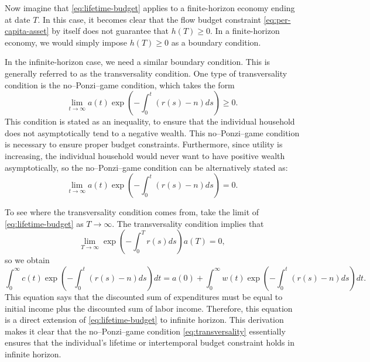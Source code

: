 \documentclass[\topdir/lecture\_notes.tex]{subfiles}
\begin{document}
Now imagine that \eqref{eq:lifetime-budget} applies to a finite-horizon economy ending at date \(T\).
In this case, it becomes clear that the flow budget constraint \eqref{eq:per-capita-asset} by itself does not guarantee that \(h(T) \geq 0\).
In a finite-horizon economy, we would simply impose \(h(T) \geq 0\) as a boundary condition.

In the infinite-horizon case, we need a similar boundary condition.
This is generally referred to as the transversality condition.
One type of transversality condition is the no--Ponzi--game condition, which takes the form
\begin{equation}
  \lim _{t \rightarrow \infty} a(t) \exp \left(-\int_{0}^{t}(r(s)-n) ds\right) \geq 0.
  \label{eq:no-ponzi}
\end{equation}
This condition is stated as an inequality, to ensure that the individual household does not asymptotically tend to a negative wealth.
This no--Ponzi--game condition is necessary to ensure proper budget constraints.
Furthermore, since utility is increasing, the individual household would never want to have positive wealth asymptotically, so the no--Ponzi--game condition can be alternatively stated as:
\begin{equation}
  \lim _{t \rightarrow \infty} a(t) \exp \left(-\int_{0}^{t}(r(s)-n) ds\right)=0.
  \label{eq:transversality}
\end{equation}

To see where the transversality condition comes from, take the limit of \eqref{eq:lifetime-budget} as \(T \rightarrow \infty\). The transversality condition implies that
\[
  \lim_{T\to\infty}\exp \left(-\int_{0}^{T} r(s) ds\right) a(T) =0,
\]
so we obtain
\[
  \int_{0}^{\infty} c(t) \exp \left(-\int_{0}^{t}(r(s)-n) ds\right) dt=a(0)+\int_{0}^{\infty} w(t) \exp \left(-\int_{0}^{t}(r(s)-n) ds\right) dt.
\]
This equation says that the discounted sum of expenditures must be equal to initial income plus the discounted sum of labor income.
Therefore, this equation is a direct extension of \eqref{eq:lifetime-budget} to infinite horizon.
This derivation makes it clear that the no--Ponzi--game condition \eqref{eq:transversality} essentially ensures that the individual's lifetime or intertemporal budget constraint holds in infinite horizon.
\end{document}

